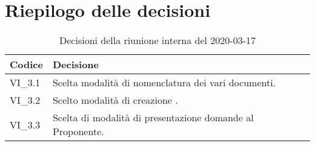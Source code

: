 \section{Riepilogo delle decisioni}
\begin{longtable}{ 
	 >{\centering}p{} >{}p{} }
	
	\caption{Decisioni della riunione interna del 2020-03-17}\\	
	
	\textbf{\color{white}Codice} & 
	\textbf{\color{white}Decisione} 
	\tabularnewline  
	\endhead
	
	VI\_3.1 & Scelta modalità di nomenclatura dei vari documenti. \\
	VI\_3.2 & Scelto modalità di creazione \Glossario{}. \\
	VI\_3.3 & Scelta di modalità di presentazione domande al Proponente\ped{\textit{G}}. \\
	
\end{longtable}